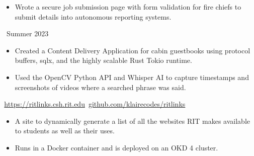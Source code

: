 \documentclass[11pt,letterpaper,ragged2e]{altacv}
\begin{document}
{
  \begin{itemize}
    \item Wrote a secure job submission page with form validation for fire chiefs to submit details into autonomous reporting systems.
  \end{itemize}
}
{\faCalendar\, Summer 2023}
{
}



{
  \begin{itemize}
    \item Created a Content Delivery Application for cabin guestbooks using protocol buffers, sqlx, and the highly scalable Rust Tokio runtime.
  \end{itemize}
}
{
}

{
  \begin{itemize}
    \item Used the OpenCV Python API and Whisper AI to capture timestamps and screenshots of videos where a searched phrase was said.
  \end{itemize}
}
{
}

{
  {\faLink} \,\href{https://ritlinks.csh.rit.edu}{https://ritlinks.csh.rit.edu}\quad
  {\faGithub} \,\href{https://github.com/klairecodes/ritlinks}{github.com/klairecodes/ritlinks}
}
{
  \begin{itemize}
    \item A site to dynamically generate a list of all the websites RIT makes available to students as well as their uses.
    \item Runs in a Docker container and is deployed on an OKD 4 cluster.
  \end{itemize}
}
{
}


\clearpage

\nocite{*}
\end{document}
